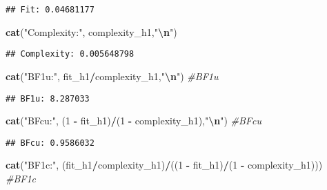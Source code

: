 \documentclass[
]{article}
\newenvironment{Shaded}{\begin{snugshade}}{\end{snugshade}}
\newcommand{\CommentTok}[1]{\textcolor[rgb]{0.56,0.35,0.01}{\textit{#1}}}
\newcommand{\DecValTok}[1]{\textcolor[rgb]{0.00,0.00,0.81}{#1}}
\newcommand{\FunctionTok}[1]{\textcolor[rgb]{0.13,0.29,0.53}{\textbf{#1}}}
\newcommand{\NormalTok}[1]{#1}
\newcommand{\SpecialCharTok}[1]{\textcolor[rgb]{0.81,0.36,0.00}{\textbf{#1}}}
\newcommand{\StringTok}[1]{\textcolor[rgb]{0.31,0.60,0.02}{#1}}
\begin{document}
\begin{verbatim}
## Fit: 0.04681177
\end{verbatim}

\begin{Shaded}
\begin{Highlighting}[]
\FunctionTok{cat}\NormalTok{(}\StringTok{"Complexity:"}\NormalTok{, complexity\_h1,}\StringTok{"}\SpecialCharTok{\textbackslash{}n}\StringTok{"}\NormalTok{)}
\end{Highlighting}
\end{Shaded}

\begin{verbatim}
## Complexity: 0.005648798
\end{verbatim}

\begin{Shaded}
\begin{Highlighting}[]
\FunctionTok{cat}\NormalTok{(}\StringTok{"BF1u:"}\NormalTok{, fit\_h1}\SpecialCharTok{/}\NormalTok{complexity\_h1,}\StringTok{"}\SpecialCharTok{\textbackslash{}n}\StringTok{"}\NormalTok{)                                      }\CommentTok{\#BF1u}
\end{Highlighting}
\end{Shaded}

\begin{verbatim}
## BF1u: 8.287033
\end{verbatim}

\begin{Shaded}
\begin{Highlighting}[]
\FunctionTok{cat}\NormalTok{(}\StringTok{"BFcu:"}\NormalTok{, (}\DecValTok{1} \SpecialCharTok{{-}}\NormalTok{ fit\_h1)}\SpecialCharTok{/}\NormalTok{(}\DecValTok{1} \SpecialCharTok{{-}}\NormalTok{ complexity\_h1),}\StringTok{"}\SpecialCharTok{\textbackslash{}n}\StringTok{"}\NormalTok{)                              }\CommentTok{\#BFcu}
\end{Highlighting}
\end{Shaded}

\begin{verbatim}
## BFcu: 0.9586032
\end{verbatim}

\begin{Shaded}
\begin{Highlighting}[]
\FunctionTok{cat}\NormalTok{(}\StringTok{"BF1c:"}\NormalTok{, (fit\_h1}\SpecialCharTok{/}\NormalTok{complexity\_h1)}\SpecialCharTok{/}\NormalTok{((}\DecValTok{1} \SpecialCharTok{{-}}\NormalTok{ fit\_h1)}\SpecialCharTok{/}\NormalTok{(}\DecValTok{1} \SpecialCharTok{{-}}\NormalTok{ complexity\_h1)))     }\CommentTok{\#BF1c}
\end{Highlighting}
\end{Shaded}
\end{document}
